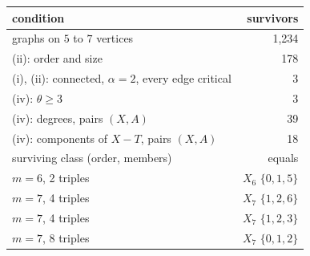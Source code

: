 \begin{tabular}{lr}
\toprule
condition & survivors \\
\midrule
graphs on $5$ to $7$ vertices & 1{,}234 \\
(ii): order and size & 178 \\
(i), (ii): connected, $\alpha=2$, every edge critical & 3 \\
(iv): $\theta\ge3$ & 3 \\
(iv): degrees, pairs $(X,A)$ & 39 \\
(iv): components of $X-T$, pairs $(X,A)$ & 18 \\
\midrule
surviving class (order, members) & equals \\
\midrule
$m=6$, 2 triples & $X_6$ $\{0, 1, 5\}$ \\
$m=7$, 4 triples & $X_7$ $\{1, 2, 6\}$ \\
$m=7$, 4 triples & $X_7$ $\{1, 2, 3\}$ \\
$m=7$, 8 triples & $X_7$ $\{0, 1, 2\}$ \\
\bottomrule
\end{tabular}
